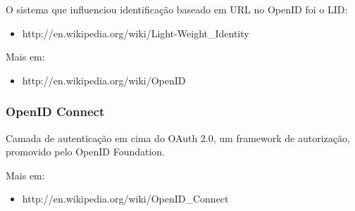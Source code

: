 \documentclass[11pt]{article}
\begin{document}
O sistema que influenciou identificação baseado em URL no OpenID foi o LID:

\begin{itemize}
  \item{http://en.wikipedia.org/wiki/Light-Weight\_Identity}
\end{itemize}

Mais em:
\begin{itemize}
  \item{http://en.wikipedia.org/wiki/OpenID}
\end{itemize}

\subsubsection{OpenID Connect}

Camada de autenticação em cima do OAuth 2.0, um framework de autorização,
promovido pelo OpenID Foundation.

Mais em:
\begin{itemize}
  \item{http://en.wikipedia.org/wiki/OpenID\_Connect}
\end{itemize}
\end{document}

